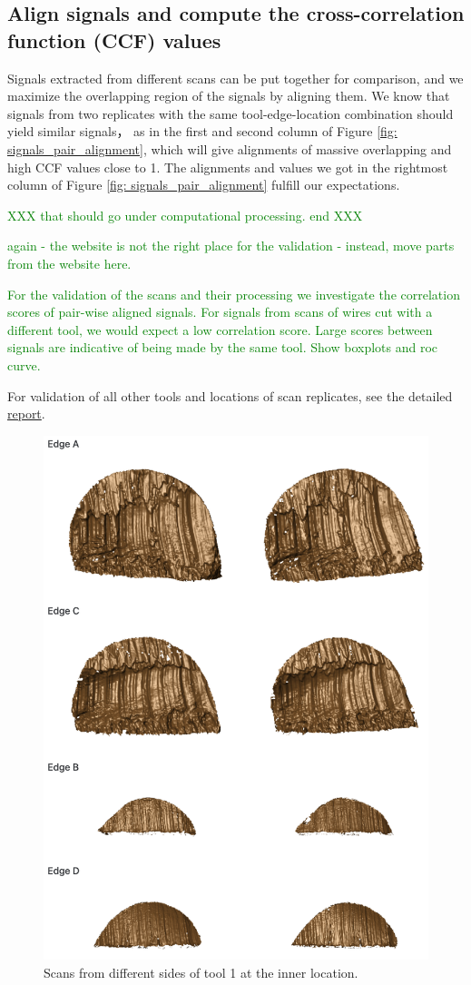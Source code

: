 \documentclass[fleqn,10pt]{wlscirep}
\newcommand{\hh}[1]{{\textcolor{Green}{#1}}}
\begin{document}
\subsection*{Align signals and compute the cross-correlation function (CCF) values}

Signals extracted from different scans can be put together for
comparison, and we maximize the overlapping region of the signals by
aligning them. We know that signals from two replicates with the same
tool-edge-location combination should yield similar signals， as in the
first and second column of Figure \ref{fig: signals_pair_alignment},
which will give alignments of massive overlapping and high CCF values
close to 1. The alignments and values we got in the rightmost column of
Figure \ref{fig: signals_pair_alignment} fulfill our expectations.

\hh{XXX that should go under computational processing. end XXX}

\hh{again - the website is not the right place for the validation - instead, move parts from the website here. }

\hh{For the validation of the scans and their processing we investigate the correlation scores of pair-wise aligned signals. For signals from scans of wires cut with a different tool, we would expect a low correlation score. Large scores between signals are indicative of being made by the same tool. 
Show boxplots and roc curve. }

For validation of all other tools and locations of scan replicates, see
the detailed
\href{https://heike.github.io/Wirecuts/data-descriptor/Technical_Validation.html}{report}.

\begin{figure}[ht]
\centering
\includegraphics[width=0.8\linewidth]{scans_pair.png}
\caption{Scans from different sides of tool 1 at the inner location.}
\label{fig: scans_pair}
\end{figure}
\end{document}
